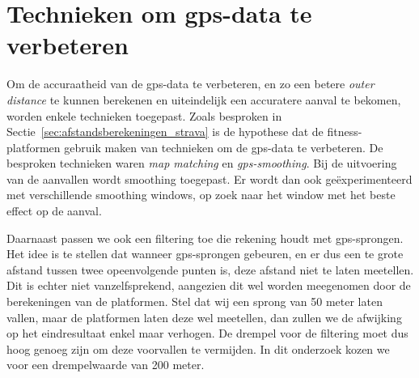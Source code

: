 \section{Technieken om gps-data te verbeteren}
Om de accuraatheid van de \ac{gps}-data te verbeteren, en zo een betere
\textit{outer distance} te kunnen berekenen en uiteindelijk een accuratere
aanval te bekomen, worden enkele technieken toegepast. Zoals besproken in
Sectie~\ref{sec:afstandsberekeningen_strava} is de hypothese dat de
fitness-platformen gebruik maken van technieken om de \ac{gps}-data te
verbeteren. De besproken technieken waren \textit{map matching} en
\textit{\ac{gps}-smoothing}. Bij de uitvoering van de aanvallen wordt smoothing
toegepast. Er wordt dan ook geëxperimenteerd met verschillende smoothing
windows, op zoek naar het window met het beste effect op de aanval.

Daarnaast passen we ook een filtering toe die rekening houdt met
\ac{gps}-sprongen. Het idee is te stellen dat wanneer \ac{gps}-sprongen
gebeuren, en er dus een te grote afstand tussen twee opeenvolgende punten is,
deze afstand niet te laten meetellen. Dit is echter niet vanzelfsprekend,
aangezien dit wel worden meegenomen door de berekeningen van de platformen.
Stel dat wij een sprong van 50 meter laten vallen, maar de platformen laten
deze wel meetellen, dan zullen we de afwijking op het eindresultaat enkel maar
verhogen. De drempel voor de filtering moet dus hoog genoeg zijn om deze
voorvallen te vermijden. In dit onderzoek kozen we voor een drempelwaarde van
200 meter.

